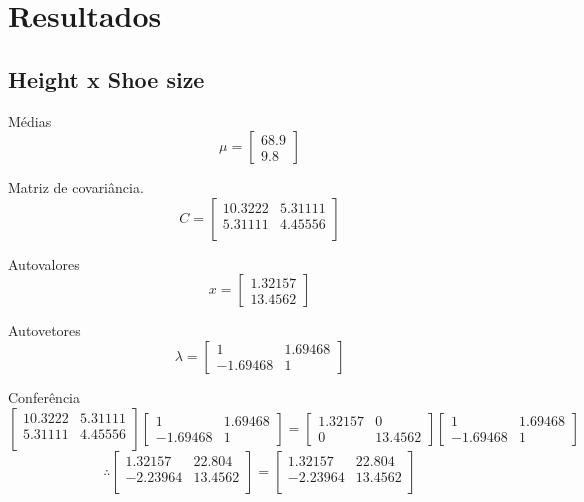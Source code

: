 \documentclass[a4paper, 11pt]{article}
\begin{document}
\newpage
\section*{Resultados}
\subsection*{Height x Shoe size}

Médias
$$ \mu =
\begin{bmatrix}
68.9 \\
9.8
\end{bmatrix}
$$

Matriz de covariância.
$$ C =
\begin{bmatrix}
10.3222&5.31111\\
5.31111&4.45556\\
\end{bmatrix}
$$

Autovalores
$$ x =
\begin{bmatrix}
1.32157\\
13.4562
\end{bmatrix}
$$

Autovetores
$$ \lambda =
\begin{bmatrix}
1&1.69468\\
-1.69468&1
\end{bmatrix}
$$

Conferência
$$
\begin{bmatrix}
10.3222&5.31111\\
5.31111&4.45556\\
\end{bmatrix}
\begin{bmatrix}
1&1.69468\\
-1.69468&1
\end{bmatrix}
=
\begin{bmatrix}
1.32157&0\\
0&13.4562
\end{bmatrix}
\begin{bmatrix}
1&1.69468\\
-1.69468&1
\end{bmatrix}
$$
$$
\therefore
\begin{bmatrix}
1.32157&22.804\\
-2.23964&13.4562\\
\end{bmatrix}
=
\begin{bmatrix}
1.32157&22.804\\
-2.23964&13.4562\\
\end{bmatrix}
$$
\end{document}
